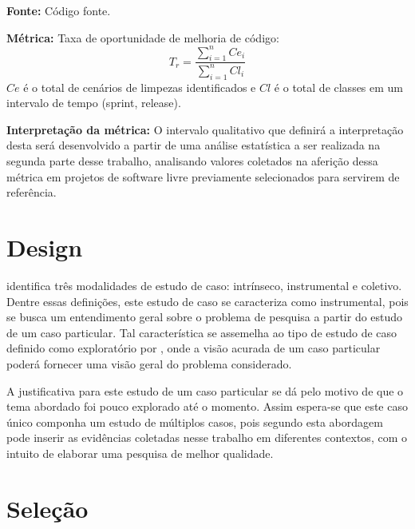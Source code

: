 \textbf{Fonte:} Código fonte.

\textbf{Métrica:} Taxa de oportunidade de melhoria de código: $$ T_r =   \frac{{\sum_{i=1}^{n}{Ce_i}}}{\sum_{i=1}^{n}{Cl_i}} $$ $ Ce $ é o total de cenários de limpezas identificados e $ Cl $  é o total de classes em um intervalo de tempo (sprint, release).

\textbf{Interpretação da métrica:} O intervalo qualitativo que definirá a interpretação desta será desenvolvido a partir de uma análise estatística a ser realizada na segunda parte desse trabalho, analisando valores coletados na aferição dessa métrica em projetos de software livre previamente selecionados para servirem de referência. 

\section{Design} \label{sec:Design}

 identifica três modalidades de estudo de caso: intrínseco, instrumental e coletivo. Dentre essas definições, este estudo de caso se caracteriza como instrumental, pois se busca um entendimento geral sobre o problema de pesquisa a partir do estudo de um caso particular. Tal característica se assemelha ao tipo de estudo de caso definido como exploratório por , onde a visão acurada de um caso particular poderá fornecer uma visão geral do problema considerado.

A justificativa para este estudo de um caso particular se dá pelo motivo de que o tema abordado foi pouco explorado até o momento. Assim espera-se que este caso único componha um estudo de múltiplos casos, pois segundo  esta abordagem pode inserir as evidências coletadas nesse trabalho em diferentes contextos, com o intuito de elaborar uma pesquisa de melhor qualidade.

\section{Seleção} \label{sec:Seleção}

